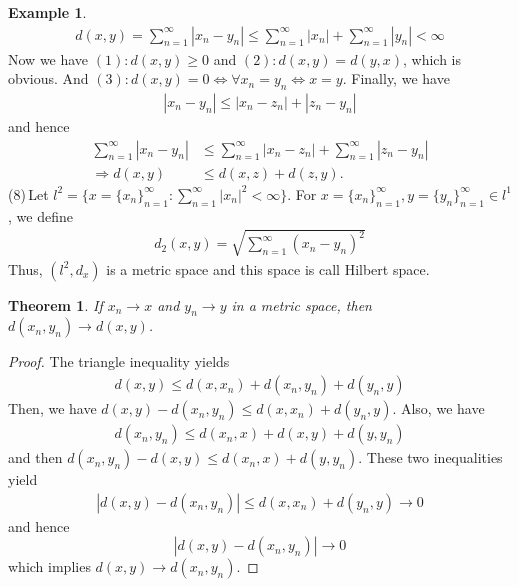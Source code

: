 \documentclass[12pt,leqno]{amsart}
\newtheorem{theorem}{Theorem}[section]
\theoremstyle{definition}
\newtheorem{example}{Example}[section]
\begin{document}
\begin{example}
\begin{align*}
    d(x,y) = \sum^\infty_{n=1} |x_n - y_n| \leq \sum^\infty_{n=1} |x_n| + \sum^\infty_{n=1} |y_n| < \infty
\end{align*}
\hspace*{2.5em}Now we have $(1):d(x,y) \geq 0$ and $(2):d(x,y) = d(y,x)$, which is obvious. And $(3): d(x,y) = 0 \Leftrightarrow \forall x_n = y_n \Leftrightarrow x = y$. Finally, we have 
\begin{align*}
    |x_n - y_n| \leq |x_n - z_n| + |z_n - y_n|
\end{align*}
and hence 
\begin{align*}
    \sum^\infty_{n=1}|x_n - y_n| & \leq \sum^\infty_{n=1}|x_n - z_n| + \sum^\infty_{n=1}|z_n - y_n|\\
    \Rightarrow d(x,y) & \leq d(x,z) + d(z,y).
\end{align*}
\hspace*{1em}(8)\,Let $l^2 = \{x = \{x_n\}^\infty_{n=1}: \sum^\infty_{n=1}|x_n|^2 < \infty\}$. For $x = \{x_n\}^\infty_{n=1}, y = \{y_n\}^\infty_{n=1} \in l^1$, we define
\begin{align*}
    d_2(x,y) = \sqrt{\sum^\infty_{n=1} (x_n - y_n)^2}
\end{align*}
Thus, $(l^2, d_x)$ is a metric space and this space is call Hilbert space.
\end{example} 

\medskip

\begin{theorem}
If $x_n\rightarrow x$ and $y_n\rightarrow y$ in a metric space, then $d(x_n, y_n) \rightarrow d(x,y)$.
\end{theorem}
\begin{proof}
The triangle inequality yields 
\begin{align*}
    d(x,y) \leq d(x,x_n) + d(x_n,y_n) + d(y_n,y)
\end{align*}
Then, we have $d(x,y) - d(x_n,y_n) \leq d(x,x_n) + d(y_n,y)$. Also, we have 
\begin{align*}
    d(x_n,y_n)\leq d(x_n,x) + d(x,y) + d(y,y_n)
\end{align*}
and then $d(x_n,y_n) - d(x,y)\leq d(x_n,x) + d(y,y_n)$. These two inequalities yield 
\begin{align*}
    |d(x,y) - d(x_n,y_n)| \leq d(x,x_n) + d(y_n,y) \to 0 
\end{align*}
and hence $$|d(x,y) - d(x_n,y_n)| \to 0 $$ which implies $d(x,y) \to d(x_n,y_n)$.
\end{proof}

\medskip
\end{document}
